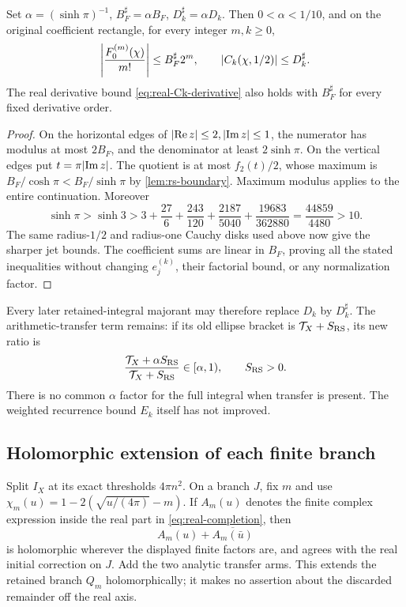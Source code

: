 \begin{proposition}
\label{prop:sharper-rs}
Set \(\alpha=(\sinh\pi)^{-1}\),
\(B_F^\sharp=\alpha B_F\), \(D_k^\sharp=\alpha D_k\).
Then \(0<\alpha<1/10\), and on the original coefficient rectangle,
for every integer \(m,k\ge0\),
\begin{equation}
 \left|\frac{F_0^{(m)}(\chi)}{m!}\right|
 \le B_F^\sharp2^m,\qquad
 \lvert C_k(\chi,1/2)\rvert\le D_k^\sharp.
 \label{eq:sharper-rs}
\end{equation}
The real derivative bound \eqref{eq:real-Ck-derivative} also holds
with \(B_F^\sharp\) for every fixed derivative order.
\end{proposition}
\begin{proof}
On the horizontal edges of \(\lvert \operatorname{Re} z\rvert\le2,\lvert \operatorname{Im} z\rvert\le1\),
the numerator has modulus at most \(2B_F\), and the denominator
at least \(2\sinh\pi\). On the vertical edges put \(t=\pi\lvert \operatorname{Im} z\rvert\).
The quotient is at most \(f_2(t)/2\), whose maximum is
\(B_F/\cosh\pi<B_F/\sinh\pi\) by \cref{lem:rs-boundary}.
Maximum modulus applies to the entire continuation. Moreover
\[
 \sinh\pi>\sinh3>
 3+\frac{27}{6}+\frac{243}{120}+\frac{2187}{5040}
     +\frac{19683}{362880}=\frac{44859}{4480}>10.
\]
The same radius-\(1/2\) and radius-one Cauchy disks used above now
give the sharper jet bounds. The coefficient sums are linear in
\(B_F\), proving all the stated inequalities without changing
\(e_j^{(k)}\), their factorial bound, or any normalization factor.
\end{proof}
Every later retained-integral majorant may therefore replace
\(D_k\) by \(D_k^\sharp\). The arithmetic-transfer term remains:
if its old ellipse bracket is \(\mathcal T_X+S_{\rm RS}\),
its new ratio is
\[
 \frac{\mathcal T_X+\alpha S_{\rm RS}}
      {\mathcal T_X+S_{\rm RS}}\in[\alpha,1),
 \qquad S_{\rm RS}>0.
\]
There is no common \(\alpha\) factor for the full integral when
transfer is present. The weighted recurrence bound \(E_k\) itself
has not improved.

\subsection{Holomorphic extension of each finite branch}
Split \(I_X\) at its exact thresholds \(4\pi n^2\).
On a branch \(J\), fix \(m\) and use
\(\chi_m(u)=1-2(\sqrt{u/(4\pi)}-m)\).
If \(A_m(u)\) denotes the finite complex expression inside
the real part in \eqref{eq:real-completion}, then
\[
 A_m(u)+\overline{A_m(\bar u)}
\]
is holomorphic wherever the displayed finite factors are, and
agrees with the real initial correction on \(J\).
Add the two analytic transfer arms. This extends the retained
branch \(Q_m\) holomorphically; it makes no assertion about the
discarded remainder off the real axis.

